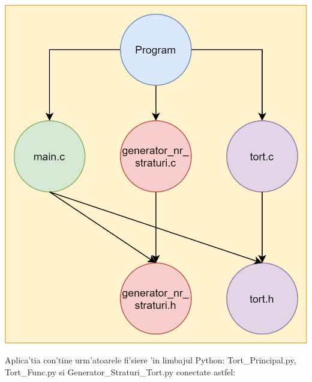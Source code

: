 \documentclass{article}
\begin{document}
\begin{center}
    
\includegraphics[scale=0.24]{StructuraPeNivelInaltC}\\

\end{center}
\newpage


Aplica'tia con'tine urm'atoarele fi'siere 'in limbajul Python: Tort\_Principal.py, Tort\_Func.py si Generator\_Straturi\_Tort.py conectate astfel:
\end{document}
